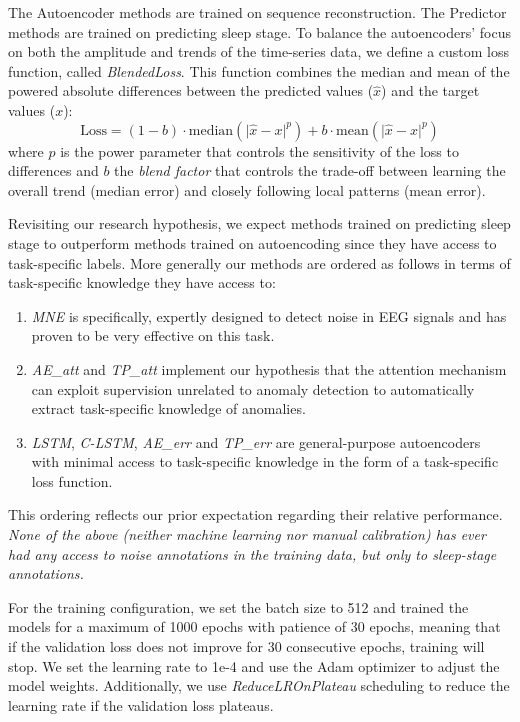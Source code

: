 \documentclass[runningheads]{llncs}
\begin{document}
The Autoencoder methods are trained on sequence reconstruction. The
Predictor methods are trained on predicting sleep stage.
%
To balance the autoencoders' focus on both the amplitude and trends of the
time-series data, we define a custom loss function, called
\emph{BlendedLoss}. This function combines the median and mean of the
powered absolute differences between the predicted values ($\hat{x}$)
and the target values ($x$):
%
$$
\text{Loss} =
  (1 - b)\cdot\mathrm{median}(\lvert \hat{x} - x \rvert^p) +
  b\cdot\mathrm{mean}(\lvert \hat{x} - x \rvert^p)
$$
%
where $p$ is the power parameter that controls the sensitivity of the
loss to differences and $b$ the \emph{blend factor} that controls
the trade-off between learning the overall trend (median error) and
closely following local patterns (mean error).

Revisiting our research hypothesis, we expect methods trained on
predicting sleep stage to outperform methods trained on autoencoding
since they have access to task-specific labels. More generally our
methods are ordered as follows in terms of task-specific knowledge
they have access to:
%
\begin{enumerate}
\item \emph{MNE} is specifically, expertly designed to detect noise in
  EEG signals and has proven to be very effective on this task.
\item \emph{AE\_att} and \emph{TP\_att} implement our hypothesis that
  the attention mechanism can exploit supervision unrelated to anomaly
  detection to automatically extract task-specific knowledge of
  anomalies.
\item \emph{LSTM}, \emph{C-LSTM}, \emph{AE\_err} and \emph{TP\_err}
  are general-purpose autoencoders with minimal access to task-specific
  knowledge in the form of a task-specific loss function.
\end{enumerate}
%
This ordering reflects our prior expectation regarding their relative
performance. \emph{None of the above (neither machine learning nor
manual calibration) has ever had any access to noise annotations
in the training data, but only to sleep-stage annotations.}

For the training configuration, we set the batch size to 512 and
trained the models for a maximum of 1000 epochs with patience of 30
epochs, meaning that if the validation loss does not improve for 30
consecutive epochs, training will stop. We set the learning rate to
1e-4 and use the Adam optimizer to adjust the model
weights. Additionally, we use \emph{ReduceLROnPlateau} scheduling to
reduce the learning rate if the validation loss plateaus.
\end{document}
